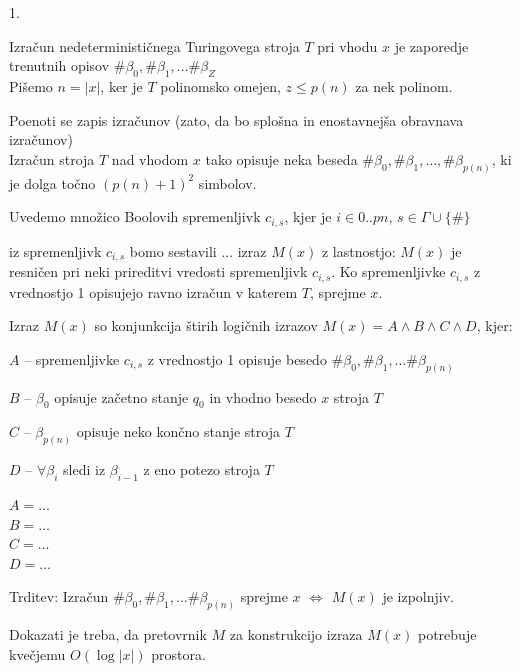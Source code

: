 \documentclass[10pt,a4paper,oneside]{book}
\begin{document}
\begin{enum}{1.}
\item Izračun nedeterminističnega Turingovega stroja $T$ pri vhodu $x$ je zaporedje trenutnih opisov $\#\beta_0, \#\beta_1, \dots \#\beta_Z $\\
Pišemo $n = |x|$, ker je $T$ polinomsko omejen, $z \leq p(n)$ za nek polinom. %
\item Poenoti se zapis izračunov (zato, da bo splošna in enostavnejša obravnava izračunov)\\
Izračun stroja $T$ nad vhodom $x$ tako opisuje neka beseda $\#\beta_0, \#\beta_1, \dots, \#\beta_{p(n)}$, ki je dolga točno $(p(n) + 1)^2$ simbolov.
\item Uvedemo množico Boolovih spremenljivk $c_{i,s}$, kjer je $i\in{0..p{n}}$, $s\in\Gamma \cup \{\#\}$%
\item iz spremenljivk $c_{i,s}$ bomo sestavili ... izraz $M(x)$ z lastnostjo:
$M(x)$ je resničen pri neki prireditvi vredosti spremenljivk $c_{i,s}$.%
Ko spremenljivke $c_{i,s}$ z vrednostjo 1 opisujejo ravno izračun v katerem $T$, sprejme $x$.
\item Izraz $M(x)$ so konjunkcija štirih logičnih izrazov $M(x) = A \wedge B \wedge C \wedge D$, kjer:
\begin{items}
\item $A$ -- spremenljivke $c_{i,s}$ z vrednostjo 1 opisuje besedo $\#\beta_0, \#\beta_1, \dots \#\beta_{p(n)}$
\item $B$ -- $\beta_0$ opisuje začetno stanje $q_0$ in vhodno besedo $x$ stroja $T$
\item $C$ -- $\beta_{p(n)}$ opisuje neko končno stanje stroja $T$
\item $D$ -- $\forall \beta_i$ sledi iz $\beta_{i-1}$ z eno potezo stroja $T$
\end{items}
\item $A = \dots$\\
$B = \dots$\\
$C = \dots$\\
$D = \dots$\\
\item Trditev: Izračun $\#\beta_0, \#\beta_1, \dots \#\beta_{p(n)}$ sprejme $x$ $\Leftrightarrow$ $M(x)$ je izpolnjiv.
\item Dokazati je treba, da pretovrnik $M$ za konstrukcijo izraza $M(x)$ potrebuje kvečjemu $O(\log |x|)$ prostora.
\end{enum}

\end{document}
